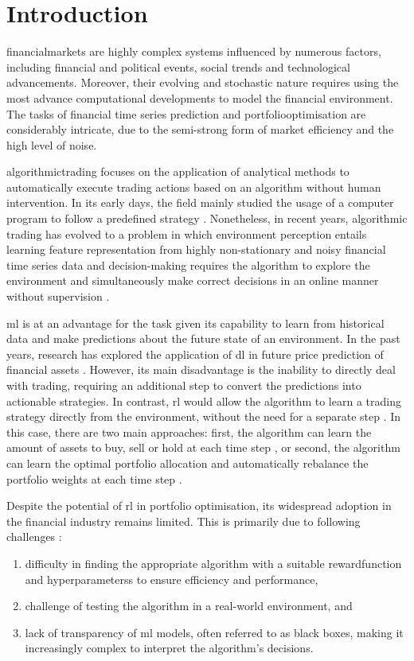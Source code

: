 \chapter{Introduction} \label{ch:introduction}

\Gls{financialmarkets} are highly complex systems influenced by numerous factors, including financial and political events, social trends and technological advancements. Moreover, their evolving and stochastic nature requires using the most advance computational developments to model the financial environment. The tasks of financial time series prediction and \Gls{portfoliooptimisation} are considerably intricate, due to the semi-strong form of market efficiency and the high level of noise. \cite{Shen2020}

\Gls{algorithmictrading} focuses on the application of analytical methods to automatically execute trading actions based on an algorithm without human intervention. In its early days, the field mainly studied the usage of a computer program to follow a predefined strategy \cite{Lei2020}. Nonetheless, in recent years, algorithmic trading has evolved to a problem in which environment perception entails learning feature representation from highly non-stationary and noisy financial time series data and decision-making requires the algorithm to explore the environment and simultaneously make correct decisions in an online manner without supervision \cite{Ma2021}.

\acrfull{ml} is at an advantage for the task given its capability to learn from historical data and make predictions about the future state of an environment. In the past years, research has explored the application of \acrfull{dl} in future price prediction of financial assets \cite{Shen2020,Nti2020,Wu2023,Hasan2024}. However, its main disadvantage is the inability to directly deal with trading, requiring an additional step to convert the predictions into actionable strategies. In contrast, \acrfull{rl} would allow the algorithm to learn a trading strategy directly from the environment, without the need for a separate step \cite{Moody2001,Yang2020}. In this case, there are two main approaches: first, the algorithm can learn the amount of assets to buy, sell or hold at each time step \cite{Liu2018}, or second, the algorithm can learn the optimal portfolio allocation and automatically rebalance the portfolio weights at each time step \cite{Guan2021}.

Despite the potential of \acrshort{rl} in portfolio optimisation, its widespread adoption in the financial industry remains limited. This is primarily due to following challenges \cite{Cortes2024}:
\begin{enumerate}
    \item difficulty in finding the appropriate algorithm with a suitable \gls{rewardfunction} and \glspl{hyperparameters} to ensure efficiency and performance,
    \item challenge of testing the algorithm in a real-world environment, and
    \item lack of transparency of \acrshort{ml} models, often referred to as black boxes, making it increasingly complex to interpret the algorithm's decisions. 
\end{enumerate}

